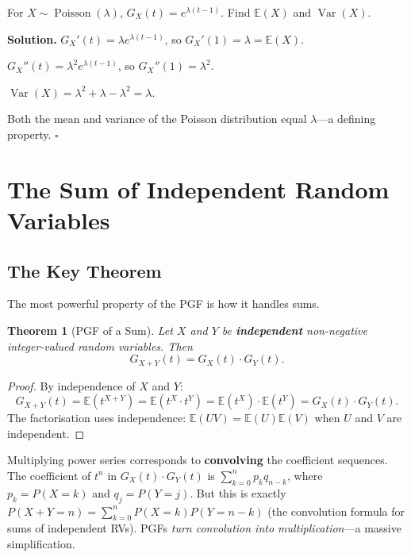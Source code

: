 \documentclass[12pt, a4paper, oneside]{book}
\theoremstyle{definition}
\theoremstyle{plain}
\newtheorem{theorem}{Theorem}[section]
\theoremstyle{remark}
\newcommand{\E}{\mathbb{E}}
\newcommand{\Var}{\operatorname{Var}}
\newenvironment{solution}
  {\par\medskip\noindent\textbf{Solution.}\quad}
  {\hfill$\square$\par\medskip}
\begin{document}
\begin{workedexample}
For $X\sim\operatorname{Poisson}(\lambda)$, $G_X(t)=e^{\lambda(t-1)}$.
Find $\E(X)$ and $\Var(X)$.

\begin{solution}
$G_X'(t) = \lambda e^{\lambda(t-1)}$, so $G_X'(1) = \lambda = \E(X)$.\ \checkmark

$G_X''(t) = \lambda^2 e^{\lambda(t-1)}$, so $G_X''(1) = \lambda^2$.

$\Var(X) = \lambda^2 + \lambda - \lambda^2 = \lambda$.\ \checkmark

Both the mean and variance of the Poisson distribution equal $\lambda$---a
defining property.
\end{solution}
\end{workedexample}

\section{The Sum of Independent Random Variables}
\label{sec:pgf-sum}

\subsection{The Key Theorem}

The most powerful property of the PGF is how it handles sums.

\begin{theorem}[PGF of a Sum]
\label{thm:pgf-sum}
Let $X$ and $Y$ be \textbf{independent} non-negative integer-valued random
variables.  Then
\[
  G_{X+Y}(t) = G_X(t)\cdot G_Y(t).
\]
\end{theorem}

\begin{proof}
By independence of $X$ and $Y$:
\[
  G_{X+Y}(t) = \E(t^{X+Y}) = \E(t^X\cdot t^Y) = \E(t^X)\cdot\E(t^Y)
  = G_X(t)\cdot G_Y(t).
\]
The factorisation uses independence: $\E(UV)=\E(U)\E(V)$ when $U$ and $V$
are independent.
\end{proof}

\begin{intuition}
Multiplying power series corresponds to \textbf{convolving} the coefficient
sequences.  The coefficient of $t^n$ in $G_X(t)\cdot G_Y(t)$ is
$\sum_{k=0}^n p_k q_{n-k}$, where $p_k=P(X=k)$ and $q_j=P(Y=j)$.  But this
is exactly $P(X+Y=n)=\sum_{k=0}^n P(X=k)P(Y=n-k)$ (the convolution formula
for sums of independent RVs).  PGFs \emph{turn convolution into
multiplication}---a massive simplification.
\end{intuition}
\end{document}

